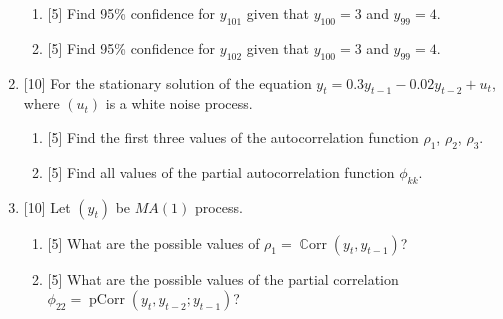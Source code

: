 \documentclass[12pt]{article}
\DeclareMathOperator{\Corr}{\mathbb{C}orr}
\DeclareMathOperator{\pCorr}{pCorr}
\begin{document}
\begin{enumerate}
    \begin{enumerate}
        \item {[5]} Find 95\% confidence for $y_{101}$ given that $y_{100} = 3$ and $y_{99} = 4$.
        \item {[5]} Find 95\% confidence for $y_{102}$ given that $y_{100} = 3$ and $y_{99} = 4$.
    \end{enumerate}
    \item {[10]} For the stationary solution of the equation $y_t = 0.3 y_{t-1} - 0.02 y_{t-2} + u_t$, 
    where $(u_t)$ is a white noise process. 
    \begin{enumerate}
        \item {[5]} Find the first three values of the autocorrelation function $\rho_1$, $\rho_2$, $\rho_3$.
        \item {[5]} Find all values of the partial autocorrelation function $\phi_{kk}$.
    \end{enumerate}

    \item {[10]} Let $(y_t)$ be $MA(1)$ process. 
    \begin{enumerate}
        \item {[5]} What are the possible values of $\rho_1 = \Corr(y_t, y_{t-1})$?
        \item {[5]} What are the possible values of the partial correlation $\phi_{22} = \pCorr(y_t, y_{t-2}; y_{t-1})$?
    \end{enumerate}
\end{enumerate}
\end{document}

